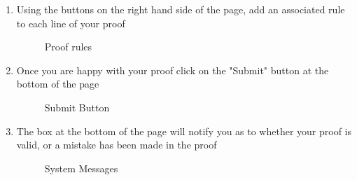 \begin{enumerate}
		\item Using the buttons on the right hand side of the page, add an associated rule to each line of your proof
			\begin{figure}[!ht]
				\centering
				\caption{Proof rules}
			\end{figure}
		
		\item Once you are happy with your proof click on the "Submit" button at the bottom of the page
			\begin{figure}[!ht]
				\centering
				\caption{Submit Button}
			\end{figure}
		
		\item The box at the bottom of the page will notify you as to whether your proof is valid, or a mistake has been made in the proof
		\begin{figure}[!ht]
			\centering
			\caption{System Messages}
		\end{figure}
	

\end{enumerate}
